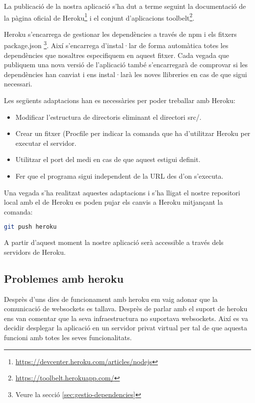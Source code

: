 La publicació de la nostra aplicació s'ha dut a terme seguint la documentació de la pàgina oficial de Heroku\footnote{\url{https://devcenter.heroku.com/articles/nodejs}} i el conjunt d'aplicacions toolbelt\footnote{\url{https://toolbelt.herokuapp.com/}}. 

Heroku s'encarrega de gestionar les dependències a través de npm i els fitxers package.json \footnote{Veure la secció \ref{sec:gestio-dependencies}}. Així s'encarrega d'instal·lar de forma automàtica totes les dependències que nosaltres especifiquem en aquest fitxer. Cada vegada que publiquem una nova versió de l'aplicació també s'encarregarà de comprovar si les dependències han canviat i ens instal·larà les noves llibreries en cas de que sigui necessari. 

Les següents adaptacions han es necessàries per poder treballar amb Heroku: 

\begin{itemize}
\item{Modificar l'estructura de directoris eliminant el directori src/.}
\item{Crear un fitxer (Procfile per indicar la comanda que ha d'utilitzar Heroku per executar el servidor.}
\item{Utilitzar el port del medi en cas de que aquest estigui definit. }
\item{Fer que el programa sigui independent de la URL des d'on s'executa.}
\end{itemize}

Una vegada s'ha realitzat aquestes adaptacions i s'ha lligat el nostre repositori local amb el de Heroku es poden pujar els canvis a Heroku mitjançant la comanda: 

\begin{lstlisting}[language=bash]
git push heroku
\end{lstlisting}

A partir d'aquest moment la nostre aplicació serà accessible a través dels servidors de Heroku.

\subsection{Problemes amb heroku}

Desprès d'uns dies de funcionament amb heroku em vaig adonar que la comunicació de websockets es tallava. Desprès de parlar amb el suport de heroku ens van comentar que la seva infraestructura no suportava websockets. Així es va decidir desplegar la aplicació en un servidor privat virtual per tal de que aquesta funcioni amb totes les seves funcionalitats. 

